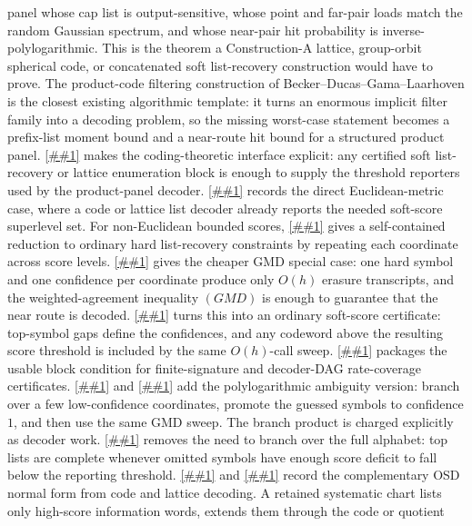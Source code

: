\documentclass[10pt]{article}
\newcommand{\cref}[1]{\ref{##1}}
\newcommand{\Cref}[1]{\ref{##1}}
\theoremstyle{definition}
\begin{document}
panel whose cap list is output-sensitive, whose point and far-pair loads match
the random Gaussian spectrum, and whose near-pair hit probability is
inverse-polylogarithmic.  This is the theorem a Construction-A lattice,
group-orbit spherical code, or concatenated soft list-recovery construction
would have to prove.  The product-code filtering construction of
Becker--Ducas--Gama--Laarhoven is the closest existing algorithmic template:
it turns an enormous implicit filter family into a decoding problem, so the
missing worst-case statement becomes a prefix-list moment bound and a near-route
hit bound for a structured product panel.  \Cref{lem:soft-list-recovery-reporter}
makes the coding-theoretic interface explicit: any certified soft list-recovery
or lattice enumeration block is enough to supply the threshold reporters used
by the product-panel decoder.  \Cref{cor:euclidean-list-decoder-reporter}
records the direct Euclidean-metric case, where a code or lattice list decoder
already reports the needed soft-score superlevel set.  For non-Euclidean
bounded scores, \cref{lem:hard-list-recovery-lift} gives a self-contained
reduction to ordinary hard list-recovery constraints by repeating each
coordinate across score levels.
\Cref{lem:reliability-erasure-sweep} gives the cheaper GMD special case:
one hard symbol and one confidence per coordinate produce only \(O(h)\)
erasure transcripts, and the weighted-agreement inequality \((GMD)\) is enough
to guarantee that the near route is decoded.
\Cref{lem:soft-score-gmd-margin} turns this into an ordinary soft-score
certificate: top-symbol gaps define the confidences, and any codeword above
the resulting score threshold is included by the same \(O(h)\)-call sweep.
\Cref{cor:gmd-block-certificate} packages the usable block condition for
finite-signature and decoder-DAG rate-coverage certificates.
\Cref{lem:chase-gmd-reporter} and
\cref{cor:chase-gmd-block-certificate} add the polylogarithmic ambiguity
version: branch over a few low-confidence coordinates, promote the guessed
symbols to confidence \(1\), and then use the same GMD sweep.  The branch
product is charged explicitly as decoder work.
\Cref{cor:top-list-chase-completeness} removes the need to branch over the
full alphabet: top lists are complete whenever omitted symbols have enough
score deficit to fall below the reporting threshold.
\Cref{lem:information-set-threshold-reporter} and
\cref{cor:ordered-statistics-information-set} record the complementary OSD
normal form from code and lattice decoding.  A retained systematic chart lists
only high-score information words, extends them through the code or quotient
\end{document}
